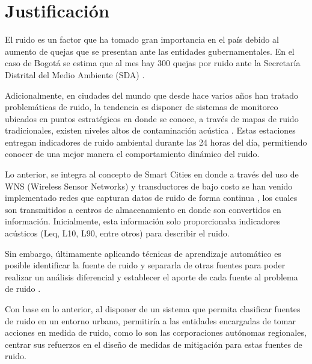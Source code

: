 \chapter{Justificación}
El ruido es un factor que ha tomado gran importancia en el país debido al aumento de quejas que se presentan ante las entidades gubernamentales. En el caso de Bogotá se estima que al mes hay 300 quejas por ruido ante la Secretaría Distrital del Medio Ambiente (SDA) \cite{Beltran2008}.

Adicionalmente, en ciudades del mundo que desde hace varios años han tratado problemáticas de ruido, la tendencia es disponer de sistemas de monitoreo ubicados en puntos estratégicos en donde se conoce, a través de mapas de ruido tradicionales, existen niveles altos de contaminación acústica \cite{Bellucci2018}. Estas estaciones entregan indicadores de ruido ambiental durante las 24 horas del día, permitiendo conocer de una mejor manera el comportamiento dinámico del ruido. 

Lo anterior, se integra al concepto de Smart Cities en donde a través del uso de WNS (Wireless Sensor Networks) y transductores de bajo costo se han venido implementado redes que capturan datos de ruido de forma continua \cite{Asensio2017}, los cuales son transmitidos a centros de almacenamiento en donde son convertidos en información. Inicialmente, esta información solo proporcionaba indicadores acústicos (Leq, L10, L90, entre otros) para describir el ruido.

Sin embargo, últimamente aplicando técnicas de aprendizaje automático es posible identificar la fuente de ruido y separarla de otras fuentes para poder realizar un análisis diferencial y establecer el aporte de cada fuente al problema de ruido \cite{Imoto}.

Con base en lo anterior, al disponer de un sistema que permita clasificar fuentes de ruido en un entorno urbano, permitiría a las entidades encargadas de tomar acciones en medida de ruido, como lo son las corporaciones autónomas regionales, centrar sus refuerzos en el diseño de medidas de mitigación para estas fuentes de ruido.